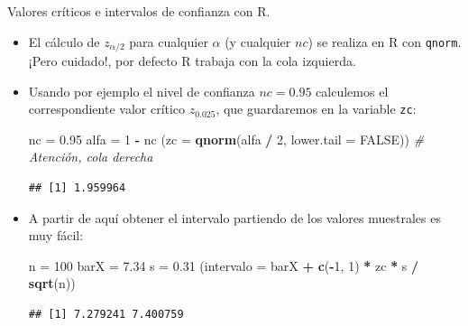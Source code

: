 \documentclass[
  9pt,
  ignorenonframetext,
]{beamer}
\newenvironment{Shaded}{\begin{snugshade}}{\end{snugshade}}
\newcommand{\CommentTok}[1]{\textcolor[rgb]{0.56,0.35,0.01}{\textit{#1}}}
\newcommand{\DataTypeTok}[1]{\textcolor[rgb]{0.13,0.29,0.53}{#1}}
\newcommand{\DecValTok}[1]{\textcolor[rgb]{0.00,0.00,0.81}{#1}}
\newcommand{\FloatTok}[1]{\textcolor[rgb]{0.00,0.00,0.81}{#1}}
\newcommand{\KeywordTok}[1]{\textcolor[rgb]{0.13,0.29,0.53}{\textbf{#1}}}
\newcommand{\NormalTok}[1]{#1}
\newcommand{\OperatorTok}[1]{\textcolor[rgb]{0.81,0.36,0.00}{\textbf{#1}}}
\newcommand{\OtherTok}[1]{\textcolor[rgb]{0.56,0.35,0.01}{#1}}
\newcommand{\StringTok}[1]{\textcolor[rgb]{0.31,0.60,0.02}{#1}}
\begin{document}
\begin{frame}[fragile]{Valores críticos e intervalos de confianza con
R.}
\protect\hypertarget{valores-criticos-e-intervalos-de-confianza-con-r.}{}

\begin{itemize}
\item
  El cálculo de \(z_{\alpha/2}\) para cualquier \(\alpha\) (y cualquier
  \(nc\)) se realiza en R con \texttt{qnorm}. ¡Pero cuidado!, por
  defecto R trabaja con la cola izquierda.
\item
  Usando por ejemplo el nivel de confianza \(nc = 0.95\) calculemos el
  correspondiente valor crítico \(z_{0.025}\), que guardaremos en la
  variable \texttt{zc}:\small

\begin{Shaded}
\begin{Highlighting}[]
\NormalTok{nc =}\StringTok{ }\FloatTok{0.95}
\NormalTok{alfa =}\StringTok{ }\DecValTok{1} \OperatorTok{-}\StringTok{ }\NormalTok{nc}
\NormalTok{(}\DataTypeTok{zc =} \KeywordTok{qnorm}\NormalTok{(alfa }\OperatorTok{/}\StringTok{ }\DecValTok{2}\NormalTok{, }\DataTypeTok{lower.tail =} \OtherTok{FALSE}\NormalTok{)) }\CommentTok{# Atención, cola derecha}
\end{Highlighting}
\end{Shaded}

\begin{verbatim}
## [1] 1.959964
\end{verbatim}

  \normalsize
\item
  A partir de aquí obtener el intervalo partiendo de los valores
  muestrales es muy fácil:\small

\begin{Shaded}
\begin{Highlighting}[]
\NormalTok{n =}\StringTok{ }\DecValTok{100}
\NormalTok{barX =}\StringTok{ }\FloatTok{7.34}
\NormalTok{s =}\StringTok{ }\FloatTok{0.31}
\NormalTok{(}\DataTypeTok{intervalo =}\NormalTok{ barX }\OperatorTok{+}\StringTok{ }\KeywordTok{c}\NormalTok{(}\OperatorTok{-}\DecValTok{1}\NormalTok{, }\DecValTok{1}\NormalTok{) }\OperatorTok{*}\StringTok{ }\NormalTok{zc }\OperatorTok{*}\StringTok{ }\NormalTok{s }\OperatorTok{/}\StringTok{ }\KeywordTok{sqrt}\NormalTok{(n))}
\end{Highlighting}
\end{Shaded}

\begin{verbatim}
## [1] 7.279241 7.400759
\end{verbatim}


\end{itemize}
\end{frame}
\end{document}
